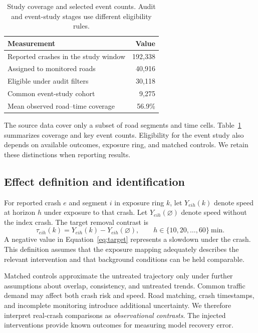 \documentclass[sigconf,nonacm]{acmart}
\begin{document}
\begin{table}[t]
\centering
\caption{Study coverage and selected event counts. Audit and event-study stages use different eligibility rules.}
\label{tab:data}
\footnotesize
\begin{tabular}{lr}
\toprule
Measurement & Value \\
\midrule
Reported crashes in the study window & 192,338 \\
Assigned to monitored roads & 40,916 \\
Eligible under audit filters & 30,118 \\
Common event-study cohort & 9,275 \\
Mean observed road--time coverage & 56.9\% \\
\bottomrule
\end{tabular}
\end{table}

The source data cover only a subset of road segments and time cells. Table~\ref{tab:data} summarizes coverage and key event counts. Eligibility for the event study also depends on available outcomes, exposure ring, and matched controls. We retain these distinctions when reporting results.

\subsection{Effect definition and identification}
For reported crash $e$ and segment $i$ in exposure ring $k$, let $Y_{eih}(k)$ denote speed at horizon $h$ under exposure to that crash. Let $Y_{eih}(\varnothing)$ denote speed without the index crash. The target removal contrast is
\begin{equation}
\tau_{eih}(k)=Y_{eih}(k)-Y_{eih}(\varnothing),\qquad
h\in\{10,20,\ldots,60\}\ \mathrm{min}.
\label{eq:target}
\end{equation}
A negative value in Equation~\eqref{eq:target} represents a slowdown under the crash. This definition assumes that the exposure mapping adequately describes the relevant intervention and that background conditions can be held comparable.

Matched controls approximate the untreated trajectory only under further assumptions about overlap, consistency, and untreated trends. Common traffic demand may affect both crash risk and speed. Road matching, crash timestamps, and incomplete monitoring introduce additional uncertainty. We therefore interpret real-crash comparisons as \emph{observational contrasts}. The injected interventions provide known outcomes for measuring model recovery error.
\end{document}
